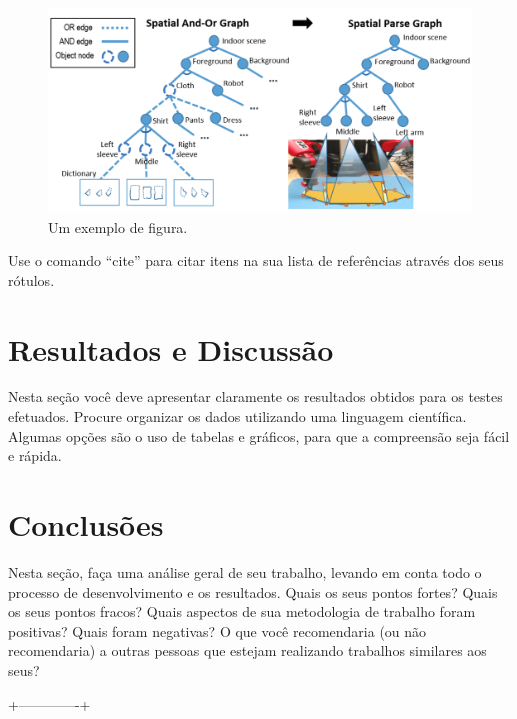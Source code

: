 \documentclass[twoside,conference,a4paper]{IEEEtran}
\begin{document}
\begin{figure}[ht]
\centering
\includegraphics[width=1\hsize]{figuras/pipeline.png}
\caption{Um exemplo de figura.}
\label{fig:fig1}
\end{figure}

Use o comando ``cite'' para citar itens na sua lista de
referências através dos seus rótulos.


\section{Resultados e Discussão}

Nesta seção você deve apresentar claramente os resultados obtidos para os testes efetuados. Procure organizar os dados utilizando uma linguagem científica. Algumas opções são o uso de tabelas e gráficos, para que a compreensão seja fácil e rápida. 

\section{Conclusões}

Nesta seção, faça uma análise geral de seu trabalho, levando em conta todo o processo de desenvolvimento e os resultados. Quais os seus pontos fortes? Quais os seus pontos fracos? Quais aspectos de sua metodologia de trabalho foram positivas? Quais foram negativas? O que você recomendaria (ou não recomendaria) a outras pessoas que estejam realizando trabalhos similares aos seus? 


 +-------------+






\end{document}
